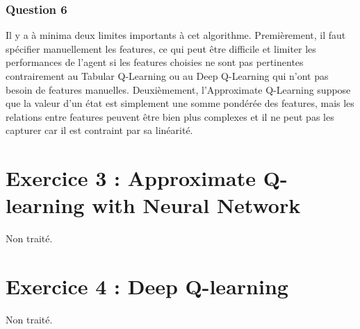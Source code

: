 \documentclass[12pt, letterpaper]{article}
\begin{document}
\subsubsection{Question 6}

Il y a à minima deux limites importants à cet algorithme. 
Premièrement, il faut spécifier manuellement les features, ce qui peut être difficile et limiter les performances de l'agent si les features choisies ne sont pas pertinentes contrairement au Tabular Q-Learning ou au Deep Q-Learning qui n'ont pas besoin de features manuelles. 
Deuxièmement, l'Approximate Q-Learning suppose que la valeur d'un état est simplement une somme pondérée des features, mais les relations entre features peuvent être bien plus complexes et il ne peut pas les capturer car il est contraint par sa linéarité.

\section{Exercice 3 : Approximate Q-learning with Neural Network}

Non traité.

\section{Exercice 4 : Deep Q-learning}

Non traité.
\end{document}
